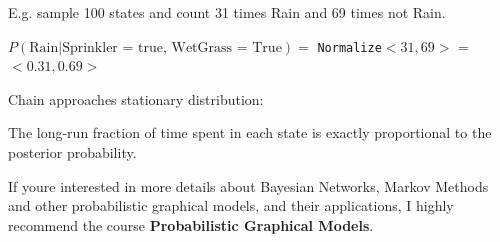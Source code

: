 \documentclass[
../EiKI_Summary.tex,
]
{subfiles}
\begin{document}
E.g. sample 100 states and count 31 times Rain and 69 times not Rain.

\begin{csmb*}
    $P(\text{Rain}|\text{Sprinkler = true, WetGrass = True}) =$ \texttt{Normalize$<31,69>$} = $<0.31, 0.69>$
\end{csmb*}

\begin{defbox}
    [Theorem]
    Chain approaches stationary distribution:

    The long-run fraction of time spent in each state is exactly proportional to the posterior probability.
\end{defbox}

If youre interested in more details about Bayesian Networks, Markov Methods and other probabilistic graphical models, and their applications, I highly recommend the course \textbf{Probabilistic Graphical Models}.
\end{document}
